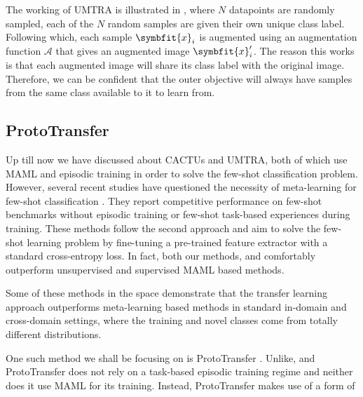 The working of UMTRA is illustrated in , where $N$ datapoints are randomly sampled, each of the $N$ random samples are given their own unique class label. Following which, each sample $\symbfit{x}_i$ is augmented using an augmentation function $\mathcal{A}$ that gives an augmented image $\symbfit{x}_i^\prime$. 
The reason this works is that each augmented image will share its class label with the original image. Therefore, we can be confident that the outer objective will always have samples from the same class available to it to learn from. 

\subsection{ProtoTransfer}\label{ssec:prototransfer}

Up till now we have discussed about CACTUs and UMTRA, both of which use MAML and episodic training in order to solve the few-shot classification problem.
However, several recent studies have questioned the necessity of meta-learning for few-shot classification \parencite{goodemballneed2020, Medina2020Self-SupervisedClassification, dhillon2019baseline, ziko2020laplacian, boudiaf2020information,chen2021self}.
They report competitive performance on few-shot benchmarks without episodic training or few-shot task-based experiences during training. These methods follow the second approach and aim to solve the few-shot learning problem by fine-tuning a pre-trained feature extractor with a standard cross-entropy loss. In fact, both our methods, \ccclr{} and \samptr{} comfortably outperform unsupervised and supervised MAML based methods.

Some of these methods \parencite{Medina2020Self-SupervisedClassification, goodemballneed2020, das2022confess} in the space demonstrate that the transfer learning approach outperforms meta-learning based methods in standard in-domain and cross-domain settings, where the training and novel classes come from totally different distributions.

One such method we shall be focusing on is ProtoTransfer \parencite{Medina2020Self-SupervisedClassification}. Unlike,  and  ProtoTransfer does not rely on a task-based episodic training regime and neither does it use MAML for its training. Instead, ProtoTransfer makes use of a form of \nameref{}

